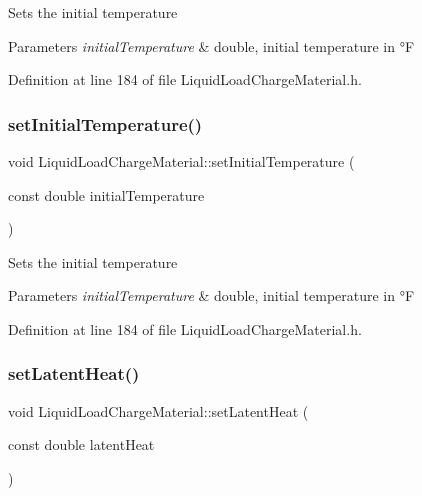 Sets the initial temperature 
\begin{DoxyParams}{Parameters}
{\em initial\+Temperature} & double, initial temperature in °F \\
\hline
\end{DoxyParams}


Definition at line 184 of file Liquid\+Load\+Charge\+Material.\+h.

\mbox{\label{class_liquid_load_charge_material_ac30600ef82db69934e8c08e4a774bb03}} 
\subsubsection{\texorpdfstring{set\+Initial\+Temperature()}{setInitialTemperature()}\hspace{0.1cm}{\footnotesize\ttfamily [3/3]}}
{\footnotesize\ttfamily void Liquid\+Load\+Charge\+Material\+::set\+Initial\+Temperature (\begin{DoxyParamCaption}\item[{const double}]{initial\+Temperature }\end{DoxyParamCaption})\hspace{0.3cm}{\ttfamily [inline]}}

Sets the initial temperature 
\begin{DoxyParams}{Parameters}
{\em initial\+Temperature} & double, initial temperature in °F \\
\hline
\end{DoxyParams}


Definition at line 184 of file Liquid\+Load\+Charge\+Material.\+h.

\mbox{\label{class_liquid_load_charge_material_a01d2d23580f27aa9e5cba1124635a677}} 
\subsubsection{\texorpdfstring{set\+Latent\+Heat()}{setLatentHeat()}\hspace{0.1cm}{\footnotesize\ttfamily [1/3]}}
{\footnotesize\ttfamily void Liquid\+Load\+Charge\+Material\+::set\+Latent\+Heat (\begin{DoxyParamCaption}\item[{const double}]{latent\+Heat }\end{DoxyParamCaption})\hspace{0.3cm}{\ttfamily [inline]}}

